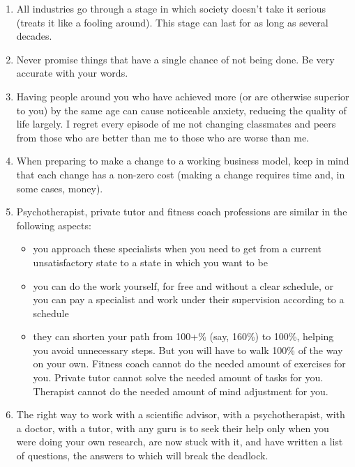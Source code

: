 \documentclass[11pt]{article}
\theoremstyle{remark}
\theoremstyle{definition}
\begin{document}
\begin{enumerate}
\item All industries go through a stage in which society doesn't take it serious (treats it like a fooling around). This stage can last for as long as several decades.

\item Never promise things that have a single chance of not being done. Be very accurate with your words. 

\item Having people around you who have achieved more (or are otherwise superior to you) by the same age can cause noticeable anxiety, reducing the quality of life largely. I regret every episode of me not changing classmates and peers from those who are better than me to those who are worse than me. 



\item When preparing to make a change to a working business model, keep in mind that each change has a non-zero cost (making a change requires time and, in some cases, money).




\item Psychotherapist, private tutor and fitness coach professions are similar in the following aspects:

\begin{itemize}

\item you approach these specialists when you need to get from a current unsatisfactory state to a state in which you want to be

\item you can do the work yourself, for free and without a clear schedule, or you can pay a specialist and work under their supervision according to a schedule

\item they can shorten your path from 100+\% (say, 160\%) to 100\%, helping you avoid unnecessary steps. But you will have to walk 100\% of the way on your own. Fitness coach cannot do the needed amount of exercises for you. Private tutor cannot solve the needed amount of tasks for you. Therapist cannot do the needed amount of mind adjustment for you.

\end{itemize}

\item The right way to work with a scientific advisor, with a psychotherapist, with a doctor, with a tutor, with any guru is to seek their help only when you were doing your own research, are now stuck with it, and have written a list of questions, the answers to which will break the deadlock.


\end{enumerate}
\end{document}
